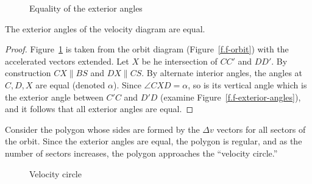 \begin{figure}[b]
\begin{minipage}{.48\textwidth}
\begin{center}
\caption{Equality of the exterior angles}\label{f.f-circle}
\end{center}
\end{minipage}
\end{figure}

\begin{theorem}
The exterior angles of the velocity diagram are equal.
\end{theorem}
\begin{proof}
Figure~\ref{f.f-circle} is taken from the orbit diagram (Figure~\ref{f.f-orbit}) with the accelerated vectors extended. Let $X$ be he intersection of $CC'$ and $DD'$. By construction $CX\parallel BS$ and $DX\parallel CS$. By alternate interior angles, the angles at $C,D,X$  are equal (denoted $\alpha$). Since $\angle CXD=\alpha$, so is its vertical angle which is the exterior angle between $C'C$ and $D'D$ (examine Figure~\ref{f.f-exterior-angles}), and it follows that all exterior angles are equal.\fqed
\end{proof}

Consider the polygon whose sides are formed by the $\Delta v$ vectors for all sectors of the orbit. Since the exterior angles are equal, the polygon is regular, and as the number of sectors increases, the polygon approaches  the ``velocity circle.''

\begin{figure}
\begin{center}
\caption{Velocity circle}\label{f.f-velocity-circle}
\end{center}
\end{figure}

